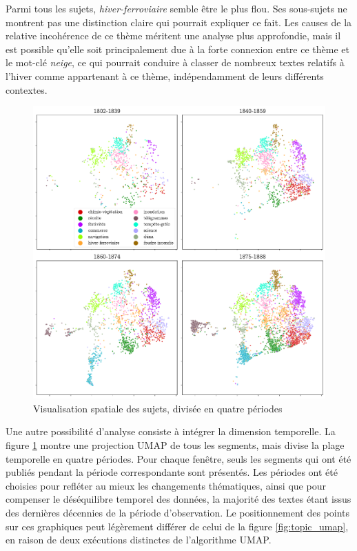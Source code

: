 \documentclass[a4paper,twoside,12pt]{article}
\begin{document}
Parmi tous les sujets, \textit{hiver-ferroviaire} semble être le plus flou. Ses sous-sujets ne montrent pas une distinction claire qui pourrait expliquer ce fait. Les causes de la relative incohérence de ce thème méritent une analyse plus approfondie, mais il est possible qu'elle soit principalement due à la forte connexion entre ce thème et le mot-clé \textit{neige}, ce qui pourrait conduire à classer de nombreux textes relatifs à l'hiver comme appartenant à ce thème, indépendamment de leurs différents contextes.

\begin{figure}[h]
    \centering
    \includegraphics[width=\textwidth]{images/topics_umap_periods.pdf}
    \caption{Visualisation spatiale des sujets, divisée en quatre périodes}
    \label{fig:topics_umap_periods}
\end{figure}

Une autre possibilité d'analyse consiste à intégrer la dimension temporelle. La figure \ref{fig:topics_umap_periods} montre une projection UMAP de tous les segments, mais divise la plage temporelle en quatre périodes. Pour chaque fenêtre, seuls les segments qui ont été publiés pendant la période correspondante sont présentés. Les périodes ont été choisies pour refléter au mieux les changements thématiques, ainsi que pour compenser le déséquilibre temporel des données, la majorité des textes étant issus des dernières décennies de la période d'observation. Le positionnement des points sur ces graphiques peut légèrement différer de celui de la figure \ref{fig:topic_umap}, en raison de deux exécutions distinctes de l'algorithme UMAP.
\end{document}
